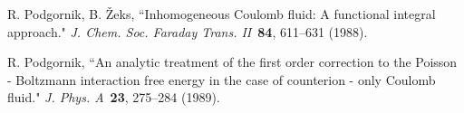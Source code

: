 \documentclass[jcp,aps,twocolumn,showpacs,supergroupedaddress,epsfig,amsmath,amssymb,eqsecnum]{revtex4}
\begin{document}
\begin{thebibliography}{99}










R. Podgornik, B. \v{Z}eks, 
``Inhomogeneous Coulomb fluid: A functional integral approach." 
{\em J. Chem. Soc. Faraday Trans. II}~{\bf 84}, 611--631 (1988).

R. Podgornik, ``An analytic treatment of the first order correction to the Poisson - Boltzmann interaction free energy in the case of counterion - only Coulomb fluid." 
{\em J. Phys. A}~{\bf 23}, 275--284 (1989).


\end{thebibliography}
\end{document}
